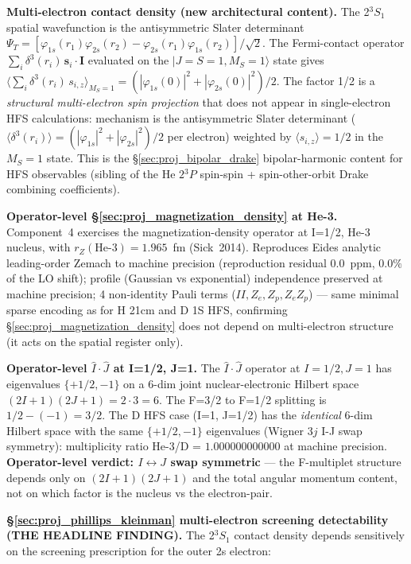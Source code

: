 \documentclass[11pt]{article}
\begin{document}
\textbf{Multi-electron contact density (new architectural content).}
The 2$^3\!S_1$ spatial wavefunction is the antisymmetric Slater
determinant $\Psi_T = [\varphi_{1s}(r_1)\varphi_{2s}(r_2) -
\varphi_{2s}(r_1)\varphi_{1s}(r_2)]/\sqrt{2}$. The Fermi-contact
operator $\sum_i \delta^3(r_i)\,\mathbf{s}_i\!\cdot\!\mathbf{I}$
evaluated on the $|J=S=1, M_S=1\rangle$ state gives
$\langle \sum_i \delta^3(r_i)\,s_{i,z}\rangle_{M_S=1} =
(|\varphi_{1s}(0)|^2 + |\varphi_{2s}(0)|^2)/2$. The factor 1/2 is a
\emph{structural multi-electron spin projection} that does not appear
in single-electron HFS calculations: mechanism is the antisymmetric
Slater determinant ($\langle\delta^3(r_i)\rangle =
(|\varphi_{1s}|^2+|\varphi_{2s}|^2)/2$ per electron) weighted by
$\langle s_{i,z}\rangle = 1/2$ in the $M_S=1$ state. This is the
\S\ref{sec:proj_bipolar_drake} bipolar-harmonic content for HFS
observables (sibling of the He $2{}^3\!P$ spin-spin + spin-other-orbit
Drake combining coefficients).

\textbf{Operator-level \S\ref{sec:proj_magnetization_density} at He-3.}
Component~4 exercises the magnetization-density operator at I=1/2,
He-3 nucleus, with $r_Z(\text{He-3}) = 1.965$~fm (Sick~2014).
Reproduces Eides analytic leading-order Zemach to machine precision
(reproduction residual $0.0$~ppm, $0.0\%$ of the LO shift); profile
(Gaussian vs exponential) independence preserved at machine precision;
4 non-identity Pauli terms ($II, Z_e, Z_p, Z_e Z_p$) --- same minimal
sparse encoding as for H 21cm and D 1S HFS, confirming
\S\ref{sec:proj_magnetization_density} does not depend on multi-electron
structure (it acts on the spatial register only).

\textbf{Operator-level $\hat{I}\!\cdot\!\hat{J}$ at I=1/2, J=1.} The
$\hat{I}\!\cdot\!\hat{J}$ operator at $I=1/2, J=1$ has eigenvalues
$\{+1/2, -1\}$ on a 6-dim joint nuclear-electronic Hilbert space
$(2I+1)(2J+1) = 2 \cdot 3 = 6$. The F=3/2 to F=1/2 splitting is
$1/2 - (-1) = 3/2$. The D HFS case (I=1, J=1/2) has the
\emph{identical} 6-dim Hilbert space with the same $\{+1/2, -1\}$
eigenvalues (Wigner $3j$ I-J swap symmetry): multiplicity ratio
He-3/D = $1.000000000000$ at machine precision.
\textbf{Operator-level verdict: $I\leftrightarrow J$ swap symmetric}
--- the F-multiplet structure depends only on $(2I+1)(2J+1)$ and the
total angular momentum content, not on which factor is the nucleus
vs the electron-pair.

\textbf{\S\ref{sec:proj_phillips_kleinman} multi-electron screening
detectability (THE HEADLINE FINDING).} The 2$^3\!S_1$ contact density
depends sensitively on the screening prescription for the outer 2s
electron:
\end{document}
